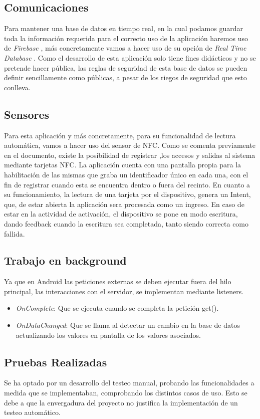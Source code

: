 \documentclass[a4paper,openright,12pt]{article}
\begin{document}
\begin{itemize}
\subsection{Comunicaciones}
Para mantener una base de datos en tiempo real, en la cual podamos guardar toda la información requerida para el correcto uso de la aplicación haremos uso de {\textit{Firebase}} \cite{Firebase_Tut}, más concretamente vamos a hacer uso de su opción de {\textit{Real Time Database}} \cite{Firebase_DOC}. Como el desarrollo de esta aplicación solo tiene fines didácticos y no se pretende hacer pública, las reglas de seguridad de esta base de datos se pueden definir sencillamente como públicas, a pesar de los riegos de seguridad que esto conlleva.
\subsection{Sensores}
Para esta aplicación y más concretamente, para su funcionalidad de lectura automática, vamos a hacer uso del sensor de NFC.
Como se comenta previamente en el documento, existe la posibilidad de registrar ,los accesos y salidas al sistema mediante tarjetas NFC. La aplicación cuenta con una pantalla propia para la habilitación de las mismas que graba un identificador único en cada una, con el fin de registrar cuando esta se encuentra dentro o fuera del recinto.
En cuanto a su funcionamiento, la lectura de una tarjeta por el dispositivo, genera un Intent, que, de estar abierta la aplicación sera procesada como un ingreso.
En caso de estar en la actividad de activación, el dispositivo se pone en modo escritura, dando feedback cuando la escritura sea completada, tanto siendo correcta como fallida.
\subsection{Trabajo en background}
Ya que en Android las peticiones externas se deben ejecutar fuera del hilo principal, las interacciones con el servidor, se implementan mediante listeners.
\begin{itemize}
    \item \textit{OnComplete}: Que se ejecuta cuando se completa la petición get().
    \item \textit{OnDataChanged}: Que se llama al detectar un cambio en la base de datos actualizando los valores en pantalla de los valores asociados.

\end{itemize}
\subsection{Pruebas Realizadas}
Se ha optado por un desarrollo del testeo manual, probando las funcionalidades a medida que se implementaban, comprobando los distintos casos de uso.
Esto se debe a que la envergadura del proyecto no justifica la implementación de un testeo automático.

\end{itemize}
\end{document}
